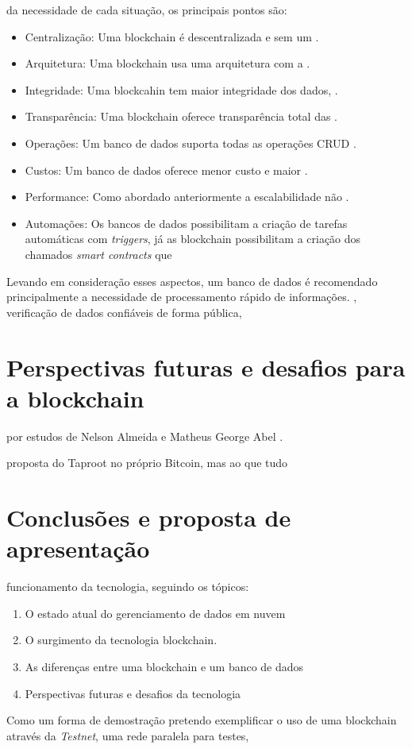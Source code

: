 \documentclass[acronym,symbols]{fei}
\begin{document}
 da necessidade de cada situação, os principais pontos são:

\begin{itemize}
    \item Centralização: Uma blockchain é descentralizada e sem um .
    \item Arquitetura: Uma blockchain usa uma arquitetura com a .
    \item Integridade: Uma blockcahin tem maior integridade dos dados, .
    \item Transparência: Uma blockchain oferece transparência total das .
    \item Operações: Um banco de dados suporta todas as operações CRUD .
    \item Custos: Um banco de dados oferece menor custo e maior .
    \item Performance: Como abordado anteriormente a escalabilidade não .
    \item Automações: Os bancos de dados possibilitam a criação de tarefas automáticas com \textit{triggers}, já as blockchain possibilitam a criação dos chamados \textit{smart contracts} que     
\end{itemize}

Levando em consideração esses aspectos, um banco de dados é recomendado  principalmente a necessidade de processamento rápido de informações.
\cite{btcRadio}, verificação de dados confiáveis de forma pública,


\chapter{Perspectivas futuras e desafios para a blockchain}

 por estudos de Nelson Almeida \cite{redeHibridaMeshComLora} e Matheus George Abel \cite{topologiaMeshComLora}.

 proposta do Taproot \cite{taproot} no próprio Bitcoin, mas ao que tudo 

\chapter{Conclusões e proposta de apresentação}
 funcionamento da tecnologia, seguindo os tópicos:

\begin{enumerate}
    \item O estado atual do gerenciamento de dados em nuvem
    \item O surgimento da tecnologia blockchain.
    \item As diferenças entre uma blockchain e um banco de dados
    \item Perspectivas futuras e desafios da tecnologia
\end{enumerate}

Como um forma de demostração pretendo exemplificar o uso de uma blockchain através da \textit{Testnet}, uma rede paralela para testes, 

\printbibliography
\end{document}
